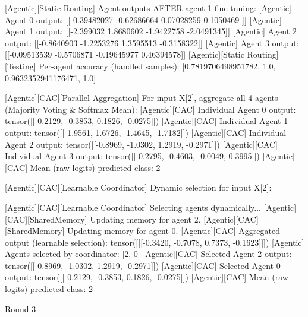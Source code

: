 [Agentic][Static Routing] Agent outputs AFTER agent 1 fine-tuning:
[Agentic] Agent 0 output: [[ 0.39482027 -0.62686664  0.07028259  0.1050469 ]]
[Agentic] Agent 1 output: [[-2.399032   1.8680602 -1.9422758 -2.0491345]]
[Agentic] Agent 2 output: [[-0.8640903 -1.2253276  1.3595513 -0.3158322]]
[Agentic] Agent 3 output: [[-0.09513539 -0.5706871  -0.19645977  0.46394578]]
[Agentic][Static Routing][Testing] Per-agent accuracy (handled samples): [0.7819706498951782, 1.0, 0.9632352941176471, 1.0]

[Agentic][CAC][Parallel Aggregation] For input X[2], aggregate all 4 agents (Majority Voting & Softmax Mean):
[Agentic][CAC] Individual Agent 0 output: tensor([[ 0.2129, -0.3853,  0.1826, -0.0275]])
[Agentic][CAC] Individual Agent 1 output: tensor([[-1.9561,  1.6726, -1.4645, -1.7182]])
[Agentic][CAC] Individual Agent 2 output: tensor([[-0.8969, -1.0302,  1.2919, -0.2971]])
[Agentic][CAC] Individual Agent 3 output: tensor([[-0.2795, -0.4603, -0.0049,  0.3995]])
[Agentic][CAC] Mean (raw logits) predicted class: 2

[Agentic][CAC][Learnable Coordinator] Dynamic selection for input X[2]:

[Agentic][CAC][Learnable Coordinator] Selecting agents dynamically...
[Agentic][CAC][SharedMemory] Updating memory for agent 2.
[Agentic][CAC][SharedMemory] Updating memory for agent 0.
[Agentic][CAC] Aggregated output (learnable selection): tensor([[[-0.3420, -0.7078,  0.7373, -0.1623]]])
[Agentic] Agents selected by coordinator: [2, 0]
[Agentic][CAC] Selected Agent 2 output: tensor([[-0.8969, -1.0302,  1.2919, -0.2971]])
[Agentic][CAC] Selected Agent 0 output: tensor([[ 0.2129, -0.3853,  0.1826, -0.0275]])
[Agentic][CAC] Mean (raw logits) predicted class: 2

Round 3

